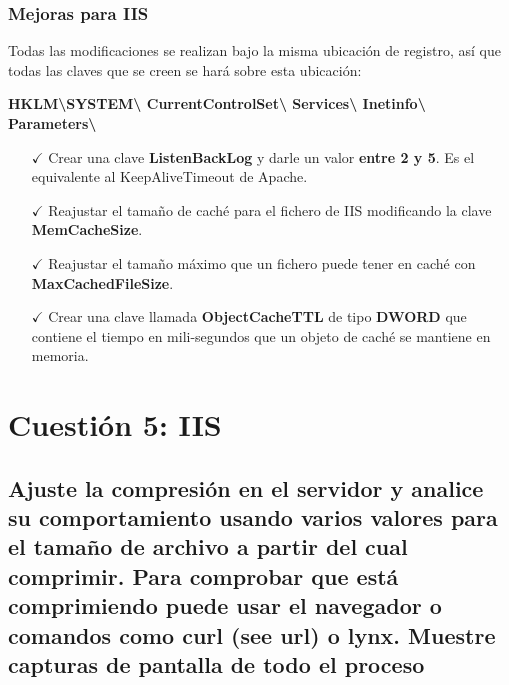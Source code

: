 \subsubsection{Mejoras para IIS\cite{enlace9}}
Todas las modificaciones se
realizan bajo la misma ubicación de registro, así que todas las claves que se creen se hará sobre esta ubicación:

\textbf{HKLM\textbackslash SYSTEM\textbackslash
	CurrentControlSet\textbackslash
	 Services\textbackslash
	  Inetinfo\textbackslash
	   Parameters\textbackslash
    }

\begin{itemize}
	\item [$ \checkmark $] Crear una clave \textbf{ListenBackLog} y darle un valor \textbf{entre 2 y 5}. Es el equivalente al
	KeepAliveTimeout de Apache.
	
	\item [$ \checkmark $] Reajustar el tamaño de caché para el fichero de IIS modificando la clave \textbf{MemCacheSize}.
	
	\item [$ \checkmark $] Reajustar el tamaño máximo que un fichero puede tener en caché con \textbf{MaxCachedFileSize}.
	
	\item [$ \checkmark $] Crear una clave llamada \textbf{ObjectCacheTTL} de tipo \textbf{DWORD} que contiene el tiempo en
	mili-segundos que un objeto de caché se mantiene en memoria.
	
\end{itemize}

\section{Cuestión 5: IIS}
\subsection{Ajuste la compresión en el servidor y analice su
	comportamiento usando varios valores para el tamaño de archivo a partir
	del cual comprimir. Para comprobar que está comprimiendo puede usar el
	navegador o comandos como curl (see url) o lynx. Muestre capturas de
	pantalla de todo el proceso}

